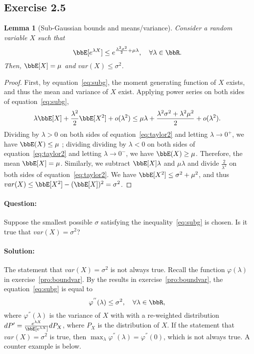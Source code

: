 \documentclass[11pt]{article}
\theoremstyle{plain}
\newtheorem{lem}{Lemma}
\theoremstyle{definition}
\begin{document}
\subsection{Exercise 2.5}
\begin{lem}[Sub-Gaussian bounds and means/variance] Consider a random variable $X$ such that
\begin{equation}\label{eq:subg}
	 \bbE[e^{\lambda X}] \leq e^{\frac{\lambda^2 \sigma^2}{2} + \mu \lambda}, \quad \forall \lambda \in \bbR. 
\end{equation}
	Then, $\bbE[X] = \mu$ and $var(X) \leq \sigma^2$.
\end{lem}

\begin{proof} First, by equation~\eqref{eq:subg}, the moment generating function of $X$ exists, and thus the mean and variance of $X$ exist. Applying power series on both sides of equation~\eqref{eq:subg},
\begin{equation}\label{eq:taylor2}
	 \lambda \bbE[X] + \frac{\lambda^2}{2} \bbE[X^2] + o(\lambda^2) \leq  \mu \lambda + \frac{\lambda^2 \sigma^2 + \lambda^2 \mu^2}{2} + o(\lambda^2).
\end{equation}
Dividing by $\lambda >0$ on both sides of equation~\eqref{eq:taylor2} and letting $\lambda \rightarrow 0^{+}$, we have $\bbE(X) \leq \mu$ ; dividing dividing by $\lambda <0$ on both sides of equation~\eqref{eq:taylor2} and letting $\lambda \rightarrow 0^{-}$, we have $\bbE(X) \geq \mu$. Therefore, the mean $\bbE[X] = \mu$. Similarly, we subtract $\bbE[X]\lambda$ and $\mu \lambda$ and divide $\frac{2}{\lambda^2}$ on both sides of equation~\eqref{eq:taylor2}. We have $ \bbE[X^2] \leq \sigma^2 + \mu^2$, and thus $var(X) \leq \bbE[X^2]  - (\bbE[X])^2 = \sigma^2$.
\end{proof}

\paragraph{Question:} Suppose the smallest possible $\sigma$ satisfying the inequality~\eqref{eq:subg} is chosen. Is it true that $var(X) = \sigma^2$?

\paragraph{Solution:} The statement that $var(X) = \sigma^2$ is not always true. Recall the function $\varphi(\lambda)$ in exercise~\ref{pro:boundvar}. By the results in exercise~\ref{pro:boundvar},  the equation~\eqref{eq:subg} is equal to 
\begin{equation}\label{eq:question}
	\varphi^{''}(\lambda) \leq  \sigma^2, \quad \forall \lambda \in \bbR,
\end{equation}
where $\varphi^{''} (\lambda)$ is the variance of $X$ with with a re-weighted distribution $d P' = \frac{e^{\lambda X}}{\bbE[ e^{\lambda X} ]} d P_X $, where $P_X$ is the distribution of $X$. If the statement that $var(X) = \sigma^2$ is true, then $\max_{\lambda}\varphi^{''}(\lambda) = \varphi^{''}(0)$, which is not always true. A counter example is below.
\end{document}
